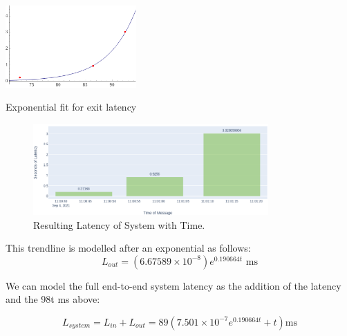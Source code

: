 \begin{marginfigure}%
    \includegraphics[width=5cm]{images/xr_discussion/exponent_fit.png}
    \caption{Exponential fit for exit latency}
    \label{fig:exponent_fit}
\end{marginfigure}

\begin{figure}[!h]
    \raggedright
    \hspace{1cm}\includegraphics[width=9cm]{images/xr_graphs/latency_sm_crop.png}
    \caption{Resulting Latency of System with Time.}
    \label{fig:latency_collisions_xr}
\end{figure}

This trendline is modelled after an exponential as follows: 
\begin{equation}
    L_{out} = (6.67589 \times 10^{-8})e^{0.190664t} \text{ ms}
\end{equation}

We can model the full end-to-end system latency as the addition of the 
latency and the 98t ms above: 

\begin{equation}
    L_{system} = L_{in} + L_{out} = 89 (7.501 \times 10^{-7} e^{0.190664 t} + t) \text{ms}
\end{equation}



